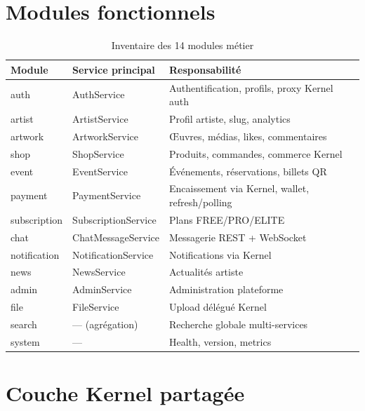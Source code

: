 \section{Modules fonctionnels}

\begin{table}[h]
  \centering
  \caption{Inventaire des 14 modules métier}
  \label{tab:modules}
  \small
  \begin{tabular}{@{}llp{7cm}@{}}
    \toprule
    \textbf{Module} & \textbf{Service principal} & \textbf{Responsabilité} \\
    \midrule
    auth          & AuthService               & Authentification, profils, proxy Kernel auth \\
    artist        & ArtistService             & Profil artiste, slug, analytics \\
    artwork       & ArtworkService            & Œuvres, médias, likes, commentaires \\
    shop          & ShopService               & Produits, commandes, commerce Kernel \\
    event         & EventService              & Événements, réservations, billets QR \\
    payment       & PaymentService            & Encaissement via Kernel, wallet, refresh/polling \\
    subscription  & SubscriptionService       & Plans FREE/PRO/ELITE \\
    chat          & ChatMessageService        & Messagerie REST + WebSocket \\
    notification  & NotificationService       & Notifications via Kernel \\
    news          & NewsService               & Actualités artiste \\
    admin         & AdminService              & Administration plateforme \\
    file          & FileService               & Upload délégué Kernel \\
    search        & — (agrégation)            & Recherche globale multi-services \\
    system        & —                         & Health, version, metrics \\
    \bottomrule
  \end{tabular}
\end{table}

\section{Couche Kernel partagée}

